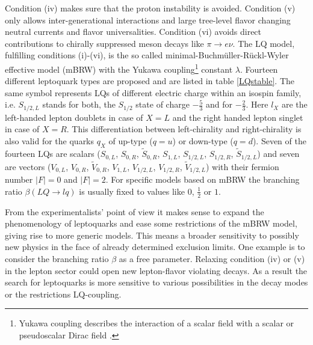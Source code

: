 Condition (iv) makes sure that the proton instability is avoided. Condition (v) only allows inter-generational interactions and large tree-level flavor changing neutral currents and flavor universalities. Condition (vi) avoids direct contributions to chirally suppressed meson decays like $\pi\rightarrow e\nu$. The LQ model, fulfilling conditions (i)-(vi), is the so called minimal-Buchm\"{u}ller-R\"{u}ckl-Wyler effective model (mBRW) with the Yukawa coupling\footnote{Yukawa coupling describes the interaction of a scalar field with a scalar or pseudoscalar Dirac field \cite{Peskin}.} constant $\lambda$. \cite{Kuze}\newline
Fourteen different leptoquark types are proposed and are listed in table \ref{LQstable}. The same symbol represents LQs of different electric charge within an isospin family, i.e. $S_{1/2,L}$ stands for both, the $S_{1/2}$ state of charge $-\frac53$ and for $-\frac23$. Here $l_X$ are the left-handed lepton doublets in case of $X=L$ and the right handed lepton singlet in case of $X=R$. This differentiation between left-chirality and right-chirality is also valid for the quarks $q_X$ of up-type ($q=u$) or down-type ($q=d$). Seven of the fourteen LQs are scalars ($S_{0,L}$, $S_{0,R}$, $\tilde{S}_{0,R}$, $S_{1,L}$, $S_{1/2,L}$, $S_{1/2,R}$, $\tilde{S}_{1/2,L}$) and seven are vectors ($V_{0,L}$, $V_{0,R}$, $\tilde{V}_{0,R}$, $V_{1,L}$, $V_{1/2,L}$, $V_{1/2,R}$, $\tilde{V}_{1/2,L}$) with their fermion number $|F|=0$ and $|F|=2$. For specific models based on mBRW the branching ratio $\beta(LQ\rightarrow lq)$ is usually fixed to values like $0$, $\frac12$ or $1$. \cite{Kuze}\par
From the experimentalists' point of view it makes sense to expand the phenomenology of leptoquarks and ease some restrictions of the mBRW model, giving rise to more generic models. This means a broader sensitivity to possibly new physics in the face of already determined exclusion limits. One example is to consider the  branching ratio $\beta$ as a free parameter. Relaxing condition (iv) or (v) in the lepton sector could open new lepton-flavor violating decays. As a result the search for leptoquarks is more sensitive to various possibilities in the decay modes or the restrictions LQ-coupling. \cite{Kuze}
%
%
